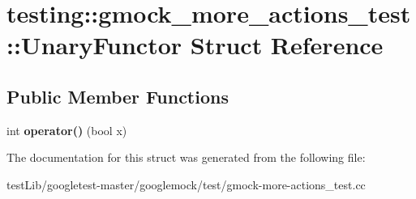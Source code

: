 \hypertarget{structtesting_1_1gmock__more__actions__test_1_1UnaryFunctor}{}\section{testing\+:\+:gmock\+\_\+more\+\_\+actions\+\_\+test\+:\+:Unary\+Functor Struct Reference}
\label{structtesting_1_1gmock__more__actions__test_1_1UnaryFunctor}
\subsection*{Public Member Functions}
\begin{DoxyCompactItemize}
\item 
\mbox{\label{structtesting_1_1gmock__more__actions__test_1_1UnaryFunctor_a3c33592b266e8ed2c7980df9868db53a}} 
int {\bfseries operator()} (bool x)
\end{DoxyCompactItemize}


The documentation for this struct was generated from the following file\+:\begin{DoxyCompactItemize}
\item 
test\+Lib/googletest-\/master/googlemock/test/gmock-\/more-\/actions\+\_\+test.\+cc\end{DoxyCompactItemize}
